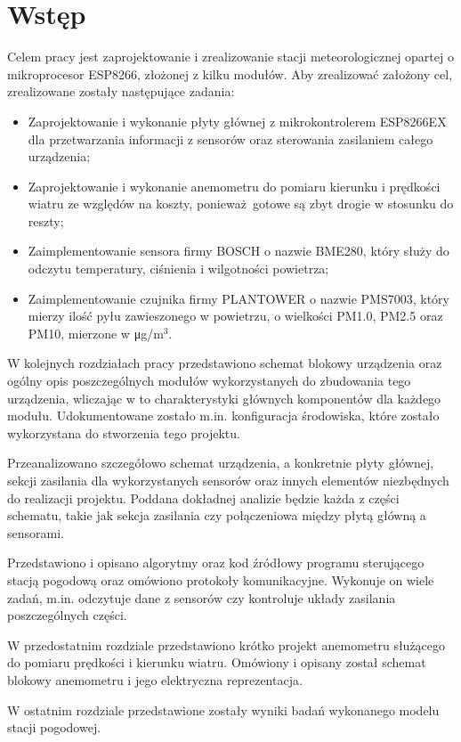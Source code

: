 \documentclass[12pt,a4paper,oneside]{memoir}
\begin{document}
\chapter{Wstęp}
	\hspace{\parindent} Celem pracy jest zaprojektowanie i zrealizowanie stacji meteorologicznej opartej o mikroprocesor ESP8266, złożonej z kilku modułów. Aby zrealizować założony cel, zrealizowane zostały następujące zadania:
	\begin{itemize}{}{}
		\item Zaprojektowanie i wykonanie płyty głównej z mikrokontrolerem ESP8266EX dla przetwarzania informacji z sensorów oraz sterowania zasilaniem całego urządzenia;
		\item Zaprojektowanie i wykonanie anemometru do pomiaru kierunku i prędkości wiatru ze względów na koszty, ponieważ gotowe są zbyt drogie w stosunku do reszty;
		\item Zaimplementowanie sensora firmy BOSCH o nazwie BME280, który służy do odczytu temperatury, ciśnienia i wilgotności powietrza;
		\item Zaimplementowanie czujnika firmy PLANTOWER o nazwie PMS7003, który mierzy ilość pyłu zawieszonego w powietrzu, o wielkości PM1.0, PM2.5 oraz PM10, mierzone w \si\micro g/m$^{3}$.
	\end{itemize}
	\par W kolejnych rozdziałach pracy przedstawiono schemat blokowy urządzenia oraz ogólny opis poszczególnych modułów wykorzystanych do zbudowania tego urządzenia, wliczając w to charakterystyki głównych komponentów dla każdego modułu. Udokumentowane zostało m.in. konfiguracja środowiska, które zostało wykorzystana do stworzenia tego projektu.
	\par Przeanalizowano szczegółowo schemat urządzenia, a konkretnie płyty głównej, sekcji zasilania dla wykorzystanych sensorów oraz innych elementów niezbędnych do realizacji projektu. Poddana dokładnej analizie będzie każda z części schematu, takie jak sekcja zasilania czy połączeniowa między płytą główną a sensorami.
	\par Przedstawiono i opisano algorytmy oraz kod źródłowy programu sterującego stacją pogodową oraz omówiono protokoły komunikacyjne. Wykonuje on wiele zadań, m.in. odczytuje dane z sensorów czy kontroluje układy zasilania poszczególnych części.
	\par W przedostatnim rozdziale przedstawiono krótko projekt anemometru służącego do pomiaru prędkości i kierunku wiatru. Omówiony i opisany został schemat blokowy anemometru i jego elektryczna reprezentacja.
	\par W ostatnim rozdziale przedstawione zostały wyniki badań wykonanego modelu stacji pogodowej.
\end{document}
